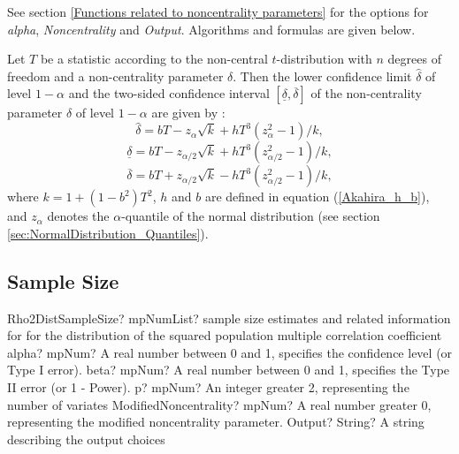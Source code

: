 \vspace{0.3cm}
See section \ref{Functions related to noncentrality parameters} for the options for  {\itshape\sffamily alpha}, {\itshape\sffamily Noncentrality} and {\itshape\sffamily Output}. Algorithms and formulas are given below.

\vspace{0.3cm}
Let $T$ be a statistic according to the non-central $t$-distribution
with $n$ degrees of freedom and a non-centrality parameter $\delta$. Then
the lower confidence limit $\widehat{\delta}$ of level $1-\alpha$ and the two-sided confidence interval $[ \underline{\delta},\overline{\delta}]$ of the
non-centrality parameter $\delta$ of level $1-\alpha$ are given by \cite{akahira_1995}:
\begin{equation}
	\widehat{\delta} = bT - z_\alpha \sqrt{k} +  h T^3 (z_\alpha^2 - 1)/k,
\end{equation} 
\begin{equation}
	\underline{\delta} = bT - z_{\alpha/2} \sqrt{k} +  h T^3 (z_{\alpha/2}^2 - 1)/k,
\end{equation} 
\begin{equation}
	\overline{\delta} = bT + z_{\alpha/2} \sqrt{k} -  h T^3 (z_{\alpha/2}^2 - 1)/k,
\end{equation} 
where $k=1+(1-b^2)T^2$, $h$ and $b$ are defined in equation (\ref{Akahira_h_b}), and $z_\alpha$ denotes the $\alpha$-quantile of the normal distribution (see section \ref{sec:NormalDistribution_Quantiles}).



\subsection{Sample Size}
\label{Rho2DistributionSampleSize}


\begin{mpFunctionsExtract}
	\mpFunctionFiveNotImplemented
	{Rho2DistSampleSize? mpNumList? sample size estimates and related information for for the distribution of the squared population multiple correlation coefficient}
	{alpha? mpNum? A real number between 0 and 1, specifies the confidence level (or Type I error).}
	{beta? mpNum?  A real number between 0 and 1, specifies the Type II error (or 1 - Power).}
	{p? mpNum? An integer greater 2, representing the number of variates}
	{ModifiedNoncentrality? mpNum? A real number greater 0, representing the modified noncentrality parameter.}
	{Output? String? A string describing the output choices}
\end{mpFunctionsExtract}


